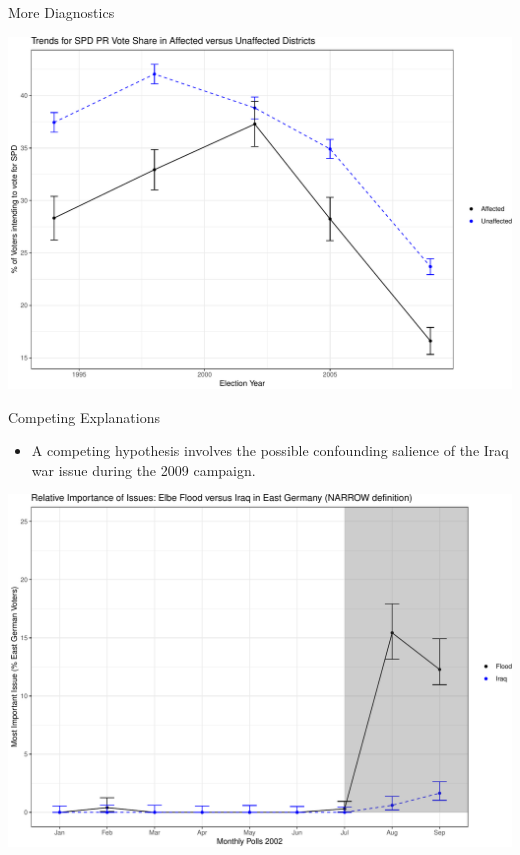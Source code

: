 \documentclass[ignorenonframetext,]{beamer}
\providecommand{\tightlist}{%
  \setlength{\itemsep}{0pt}\setlength{\parskip}{0pt}}
\begin{document}
\begin{frame}{More Diagnostics}

\begin{center}\includegraphics[width=0.8\linewidth]{Diff_in_diff_FEs_files/figure-beamer/unnamed-chunk-17-1} \end{center}

\end{frame}

\begin{frame}{Competing Explanations}

\begin{itemize}[<+->]
\tightlist
\item
  A competing hypothesis involves the possible confounding salience of
  the Iraq war issue during the 2009 campaign.
\end{itemize}

\begin{center}\includegraphics[width=0.7\linewidth]{Diff_in_diff_FEs_files/figure-beamer/unnamed-chunk-19-1} \end{center}

\end{frame}
\end{document}
